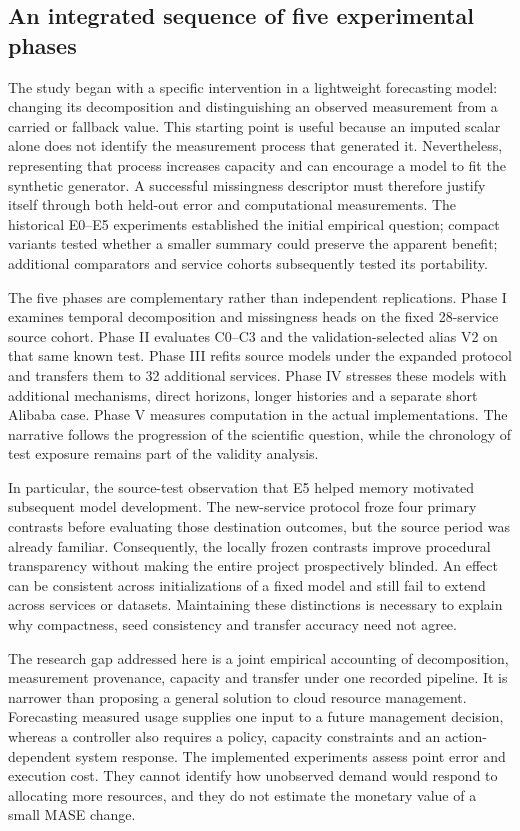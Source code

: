 \subsection{An integrated sequence of five experimental phases}
The study began with a specific intervention in a lightweight forecasting model: changing its decomposition and distinguishing an observed measurement from a carried or fallback value. This starting point is useful because an imputed scalar alone does not identify the measurement process that generated it. Nevertheless, representing that process increases capacity and can encourage a model to fit the synthetic generator. A successful missingness descriptor must therefore justify itself through both held-out error and computational measurements. The historical E0--E5 experiments established the initial empirical question; compact variants tested whether a smaller summary could preserve the apparent benefit; additional comparators and service cohorts subsequently tested its portability.

The five phases are complementary rather than independent replications. Phase I examines temporal decomposition and missingness heads on the fixed 28-service source cohort. Phase II evaluates C0--C3 and the validation-selected alias V2 on that same known test. Phase III refits source models under the expanded protocol and transfers them to 32 additional services. Phase IV stresses these models with additional mechanisms, direct horizons, longer histories and a separate short Alibaba case. Phase V measures computation in the actual implementations. The narrative follows the progression of the scientific question, while the chronology of test exposure remains part of the validity analysis.

In particular, the source-test observation that E5 helped memory motivated subsequent model development. The new-service protocol froze four primary contrasts before evaluating those destination outcomes, but the source period was already familiar. Consequently, the locally frozen contrasts improve procedural transparency without making the entire project prospectively blinded. An effect can be consistent across initializations of a fixed model and still fail to extend across services or datasets. Maintaining these distinctions is necessary to explain why compactness, seed consistency and transfer accuracy need not agree.

The research gap addressed here is a joint empirical accounting of decomposition, measurement provenance, capacity and transfer under one recorded pipeline. It is narrower than proposing a general solution to cloud resource management. Forecasting measured usage supplies one input to a future management decision, whereas a controller also requires a policy, capacity constraints and an action-dependent system response. The implemented experiments assess point error and execution cost. They cannot identify how unobserved demand would respond to allocating more resources, and they do not estimate the monetary value of a small MASE change.
